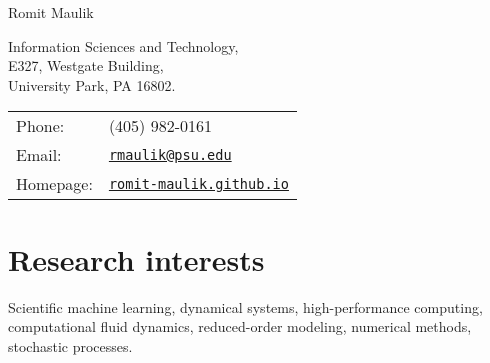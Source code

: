 \documentclass[letterpaper]{article}
\def\name{Romit Maulik}
\begin{document}
{\huge \name}


\vspace{0.25in}

\begin{minipage}{0.45\linewidth}
  Information Sciences and Technology, \\
  E327, Westgate Building, \\
  University Park, PA 16802.
\end{minipage}
\begin{minipage}{0.45\linewidth}
  \begin{tabular}{ll}
    Phone: & (405) 982-0161 \\
    Email: & \href{mailto:rmaulik@psu.edu}{\tt rmaulik@psu.edu} \\
    Homepage: & \href{https://romit-maulik.github.io/}{\tt romit-maulik.github.io} \\
  \end{tabular}
\end{minipage}

\section*{Research interests}

Scientific machine learning, dynamical systems, high-performance computing, computational fluid dynamics, reduced-order modeling, numerical methods, stochastic processes.
\end{document}
